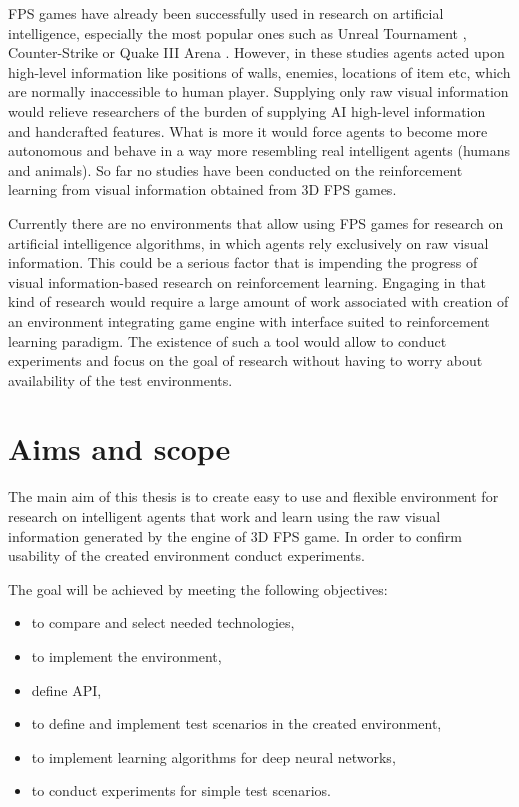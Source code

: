 FPS games have already been successfully used in research on artificial intelligence, especially the most popular ones such as Unreal Tournament \cite{6314567} \cite{6922494}, Counter-Strike \cite{5035619} or Quake III Arena \cite{el2007hybrid}.
However, in these studies agents acted upon high-level information like positions of walls, enemies, locations of item etc, which are normally inaccessible to human player.
Supplying only raw visual information would relieve researchers of the burden of supplying AI high-level information and handcrafted features.
What is more it would force agents to become more autonomous and behave in a way more resembling real intelligent agents (humans and animals).
So far no studies have been conducted on the reinforcement learning from visual information obtained from 3D FPS games.


Currently there are no environments that allow using FPS games for research on artificial intelligence algorithms, in which agents rely exclusively on raw visual information.
This could be a serious factor that is impending the progress of visual information-based research on reinforcement learning.
Engaging in that kind of research would require a large amount of work associated with creation of an environment integrating game engine with interface suited to reinforcement learning paradigm.
The existence of such a tool would allow to conduct experiments and focus on the goal of research without having to worry about availability of the test environments.
 

\section{Aims and scope}


The main aim of this thesis is to create easy to use and flexible environment for research on intelligent agents that work and learn using the raw visual information generated by the engine of 3D FPS game. In order to confirm usability of the created environment conduct experiments.%

The goal will be achieved by meeting the following objectives:
\begin{itemize}
 \item to compare and select needed technologies,
 \item to implement the environment,
 \item define API,
 \item to define and implement test scenarios in the created environment,
 \item to implement learning algorithms for deep neural networks,
 \item to conduct experiments for simple test scenarios.
\end{itemize}


